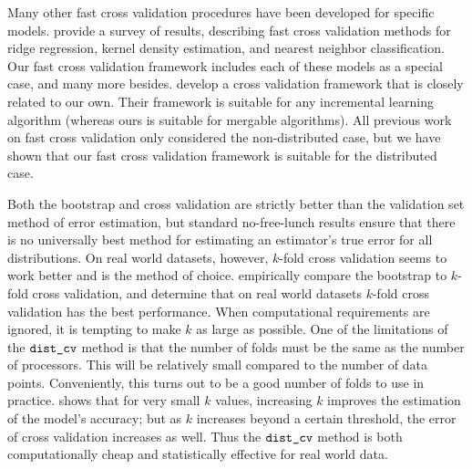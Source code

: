 \documentclass[thesis.tex]{subfiles}
\newcommand{\set}[1]{\mathcal {#1}}
\newcommand{\mappend}[1]{\oplus_{\set {#1}}}
\newcommand{\distcv}{\mkprocedure{dist\_cv}}
\begin{document}
Many other fast cross validation procedures have been developed for specific models.
\citet{arlot2010survey} provide a survey of results,
describing fast cross validation methods for ridge regression, kernel density estimation, and nearest neighbor classification.
Our fast cross validation framework includes each of these models as a special case,
and many more besides.
\citet{joulani2015fast} develop a cross validation framework that is closely related to our own.
Their framework is suitable for any incremental learning algorithm 
(whereas ours is suitable for mergable algorithms).
All previous work on fast cross validation only considered the non-distributed case,
but we have shown that our fast cross validation framework is suitable for the distributed case.

Both the bootstrap and cross validation are strictly better than the validation set method of error estimation,
but 
standard no-free-lunch results \citep[e.g.\ Chapter 8 of][]{shalev2014understanding} ensure that there is no universally best method for estimating an estimator's true error for all distributions.
On real world datasets, however, $k$-fold cross validation seems to work better and is the method of choice.
\citet{kohavi1995study} empirically compare the bootstrap to $k$-fold cross validation,
and determine that on real world datasets $k$-fold cross validation has the best performance.
When computational requirements are ignored,
it is tempting to make $k$ as large as possible.
One of the limitations of the $\distcv$ method is that the number of folds must be the same as the number of processors.
This will be relatively small compared to the number of data points.
Conveniently, this turns out to be a good number of folds to use in practice.
\citet{rao2008dangers} shows that for very small $k$ values,
increasing $k$ improves the estimation of the model's accuracy;
but as $k$ increases beyond a certain threshold, 
the error of cross validation increases as well.
Thus the $\distcv$ method is both computationally cheap and statistically effective for real world data.


%
\end{document}
